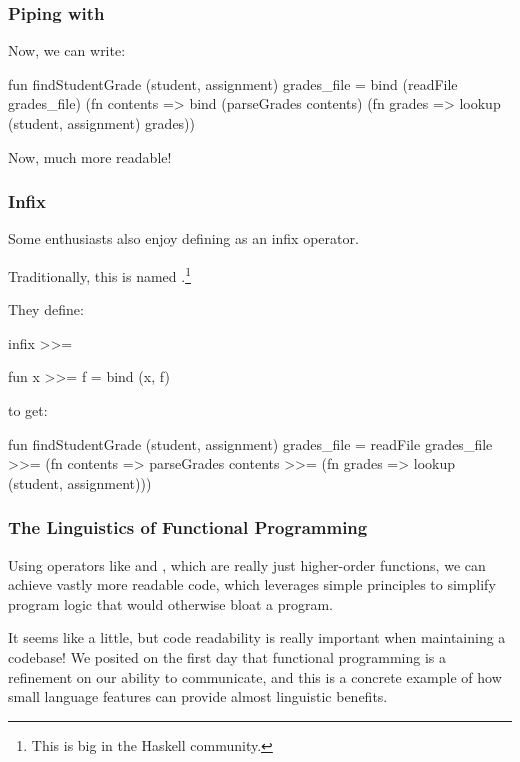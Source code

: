 \documentclass[aspectratio=169, handout]{beamer}
\begin{document}
\begin{frame}[fragile]
  \frametitle{Piping with }

  Now, we can write:

  \pause
  \begin{codeblock}
    fun findStudentGrade (student, assignment) grades_file =
      bind (readFile grades_file) (fn contents =>
      bind (parseGrades contents) (fn grades =>
      lookup (student, assignment) grades))
  \end{codeblock}

  \pause
  \vspace{\fill}

  Now, much more readable!
\end{frame}

\begin{frame}[fragile]
  \frametitle{Infix }

  Some enthusiasts also enjoy defining  as an infix operator.

  \pause
  \vspace{\fill}

  Traditionally, this is named \code{>>=}.\footnote{This is big in the Haskell community.}

  \pause
  \vspace{\fill}

  They define:
  \begin{codeblock}
    infix >>=

    fun x >>= f = bind (x, f)
  \end{codeblock}

  \pause
  \vspace{\fill}

  to get:
  \begin{codeblock}
    fun findStudentGrade (student, assignment) grades_file =
      readFile grades_file >>= (fn contents =>
      parseGrades contents >>= (fn grades =>
      lookup (student, assignment)))
  \end{codeblock}
\end{frame}

\begin{frame}[fragile]
  \frametitle{The Linguistics of Functional Programming}

  Using operators like \code{>>=} and \code{|>}, which are really just
  higher-order functions, we can achieve vastly more readable code, which
  leverages simple principles to simplify program logic that would
  otherwise bloat a program.

  \pause
  \vspace{\fill}

  It seems like a little, but code readability is really important when
  maintaining a codebase! We posited on the first day that functional
  programming is a refinement on our ability to communicate, and this is
  a concrete example of how small language features can provide almost
  linguistic benefits.
\end{frame}
\end{document}
